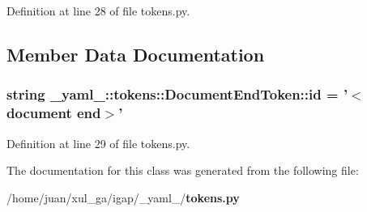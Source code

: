 Definition at line 28 of file tokens.py.

\subsection{Member Data Documentation}
\subsubsection{\setlength{\rightskip}{0pt plus 5cm}string {\bf \_\-yaml\_\-::tokens::DocumentEndToken::id} = '$<$document end$>$'\hspace{0.3cm}{\tt  [static]}}\label{class__yaml___1_1tokens_1_1DocumentEndToken_6af3e77f2d22a4fea610a9350a94e7d0}




Definition at line 29 of file tokens.py.

The documentation for this class was generated from the following file:\begin{CompactItemize}
\item 
/home/juan/xul\_\-ga/igap/\_\-yaml\_\-/{\bf tokens.py}\end{CompactItemize}
